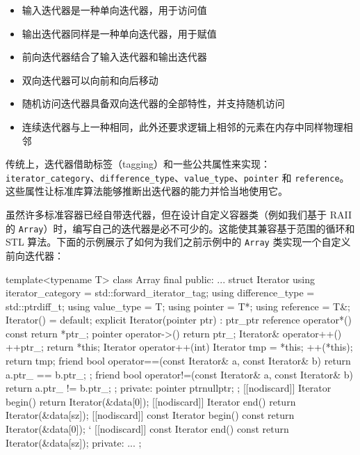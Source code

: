 \begin{itemize}
\item 输入迭代器是一种单向迭代器，用于访问值
\item 输出迭代器同样是一种单向迭代器，用于赋值
\item 前向迭代器结合了输入迭代器和输出迭代器
\item 双向迭代器可以向前和向后移动
\item 随机访问迭代器具备双向迭代器的全部特性，并支持随机访问
\label{idx:445}
\item 连续迭代器与上一种相同，此外还要求逻辑上相邻的元素在内存中同样物理相邻
\end{itemize}


传统上，迭代器借助标签（tagging）和一些公共属性来实现：\texttt{iterator\_\allowbreak{}category}、\texttt{difference\_\allowbreak{}type}、\texttt{value\_\allowbreak{}type}、\texttt{pointer} 和 \texttt{reference}。这些属性让标准库算法能够推断出迭代器的能力并恰当地使用它。

\label{idx:446}
虽然许多标准容器已经自带迭代器，但在设计自定义容器类（例如我们基于 RAII 的 \texttt{Array}）时，编写自己的迭代器是必不可少的。这能使其兼容基于范围的循环和 STL 算法。下面的示例展示了如何为我们之前示例中的 \texttt{Array} 类实现一个自定义前向迭代器：

\begin{codebox}[cpp]
template<typename T> class Array final {
public:
  ...
    struct Iterator {
        using iterator_category = std::forward_iterator_tag;
        using difference_type = std::ptrdiff_t;
        using value_type = T;
        using pointer = T*;
        using reference = T&;
        Iterator() = default;
        explicit Iterator(pointer ptr) : ptr_{ptr} {}
        reference operator*() const { return *ptr_; }
        pointer operator->() { return ptr_; }
        Iterator& operator++() {
            ++ptr_;
            return *this;
        }
        Iterator operator++(int) {
            Iterator tmp = *this;
            ++(*this);
            return tmp;
        }
        friend bool operator==(const Iterator& a, const Iterator& b) {
            return a.ptr_ == b.ptr_;
        };
        friend bool operator!=(const Iterator& a, const Iterator& b) {
            return a.ptr_ != b.ptr_;
        };
    private:
        pointer ptr{nullptr};
    };
    [[nodiscard]] Iterator begin() { return Iterator(&data[0]); }
    [[nodiscard]] Iterator end() { return Iterator(&data[sz]); }
    [[nodiscard]] const Iterator begin() const { return Iterator(&data[0]); }`
    [[nodiscard]] const Iterator end() const { return Iterator(&data[sz]); }
private:
  ...
};
\end{codebox}

